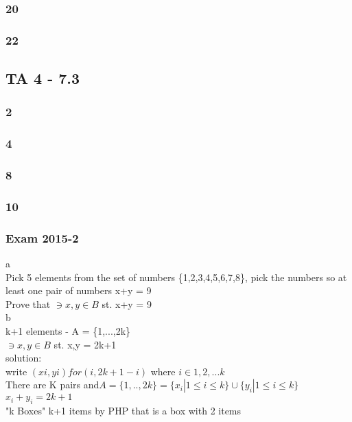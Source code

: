 \documentclass[a4paper,10pt,titlepage]{report}
\begin{document}
\subsubsection{20}

\subsubsection{22}


\subsection{TA 4 - 7.3}

\subsubsection{2}



\subsubsection{4}

\subsubsection{8}

\subsubsection{10}

\subsubsection{Exam 2015-2}
a \\
Pick 5 elements from the set of numbers \{1,2,3,4,5,6,7,8\}, pick the numbers so at least one pair of numbers x+y = 9 \\
Prove that $\ni x,y \in B$ st. x+y = 9\\

b \\
k+1 elements - A = \{1,...,2k\} \\
$\ni x,y \in B$ st. x,y = 2k+1\\

solution:\\
write $(xi, yi) for (i, 2k+1-i)$ where $i \in {1,2,...k}$ \\
There are K pairs and$ A=\{1,..,2k \} = \{x_i| 1 \leq i \leq k \} \cup \{y_i| 1 \leq i \leq k \} $\\
$x_i+y_i = 2k+1$ \\
"k Boxes" k+1 items by PHP that is a box with 2 items\\
\end{document}
